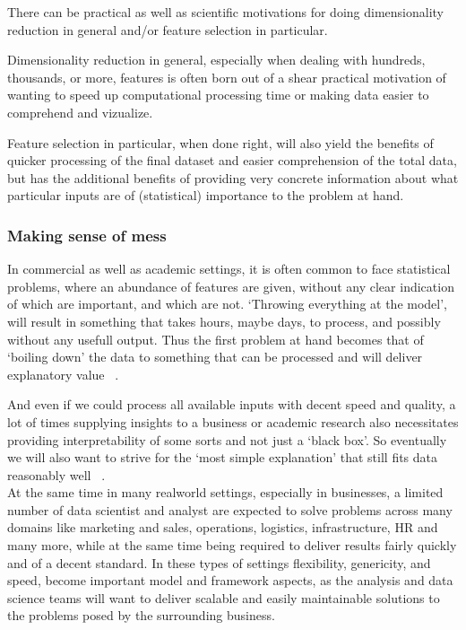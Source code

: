 \documentclass[12pt]{article}
\begin{document}
\noindent There can be practical as well as scientific motivations for doing dimensionality reduction in general and/or feature selection in particular. 

Dimensionality reduction in general, especially when dealing with hundreds, thousands, or more, features is often born out of a shear practical motivation of wanting to speed up computational processing time or making data easier to comprehend and vizualize.

Feature selection in particular, when done right, will also yield the benefits of quicker processing of the final dataset and easier comprehension of the total data, but has the additional benefits of providing very concrete information about what particular inputs are of (statistical) importance to the problem at hand.

\subsubsection{Making sense of mess}

In commercial as well as academic settings, it is often common to face statistical problems, where an abundance of features are given, without any clear indication of which are important, and which are not. `Throwing everything at the model', will result in something that takes hours, maybe days, to process, and possibly without any usefull output. Thus the first problem at hand becomes that of `boiling down' the data to something that can be processed and will deliver explanatory value ~\cite{mboostintro}.

And even if we could process all available inputs with decent speed and quality, a lot of times supplying insights to a business or academic research also necessitates providing interpretability of some sorts and not just a `black box'. So eventually we will also want to strive for the `most simple explanation' that still fits data reasonably well ~\cite{wiki:occam}. \\


\noindent At the same time in many realworld settings, especially in businesses, a limited number of data scientist and analyst are expected to solve problems across many domains like marketing and sales, operations, logistics, infrastructure, HR and many more, while at the same time being required to deliver results fairly quickly and of a decent standard. In these types of settings flexibility, genericity, and speed, become important model and framework aspects, as the analysis and data science teams will want to deliver scalable and easily maintainable solutions to the problems posed by the surrounding business.
\end{document}
